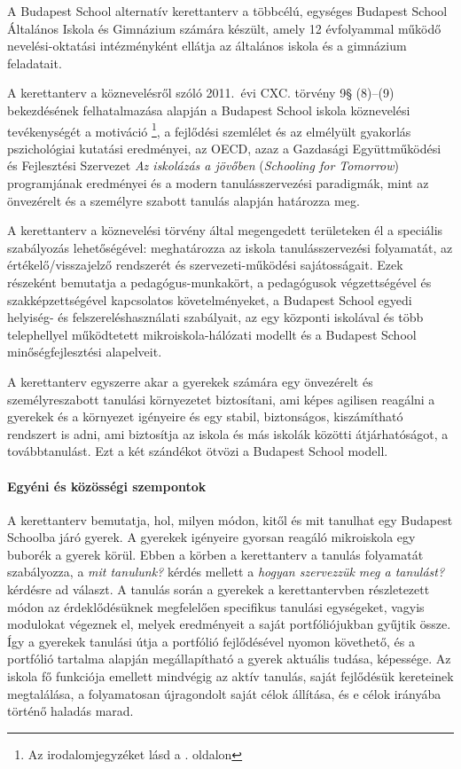 A Budapest School alternatív kerettanterv a többcélú, egységes	Budapest School Általános Iskola és Gimnázium számára készült, amely 12 évfolyammal működő nevelési-oktatási intézményként ellátja az általános iskola és a gimnázium feladatait.

A kerettanterv a köznevelésről szóló 2011.~évi CXC. törvény 9§ (8)--(9) bekezdésének felhatalmazása alapján a Budapest School iskola köznevelési tevékenységét a motiváció \citep{pink2011drive}\footnote{Az irodalomjegyzéket lásd a \pageref{sec:bibliographyk}. oldalon}, a fejlődési szemlélet \citep{growthmindset} és az elmélyült gyakorlás \citep{ericsson2016peak} pszichológiai kutatási eredményei, az  OECD, azaz a Gazdasági Együttműködési és Fejlesztési Szervezet \emph{Az iskolázás a jövőben}  (\emph{Schooling for Tomorrow}) programjának eredményei \citep{2006schooling} és a modern tanulásszervezési paradigmák, mint az önvezérelt \citep{mitra2012beyond} és a személyre szabott \citep{khan2012one} tanulás alapján határozza meg.

A kerettanterv a köznevelési törvény által megengedett területeken él a speciális szabályozás lehetőségével: meghatározza az iskola tanulásszervezési folyamatát, az értékelő/visszajelző rendszerét és szervezeti-működési sajátosságait. Ezek részeként bemutatja a pedagógus-munkakört, a pedagógusok végzettségével és szakképzettségével kapcsolatos követelményeket, a Budapest School	egyedi helyiség- és felszereléshasználati szabályait, az egy központi iskolával és több telephellyel működtetett mikroiskola-hálózati modellt és a Budapest School minőségfejlesztési alapelveit.

A kerettanterv egyszerre akar a gyerekek számára egy önvezérelt és személyreszabott tanulási környezetet biztosítani, ami képes agilisen reagálni a gyerekek és a környezet igényeire és egy stabil, biztonságos, kiszámítható rendszert is adni, ami biztosítja az iskola és más iskolák közötti átjárhatóságot, a továbbtanulást. Ezt a két szándékot ötvözi a Budapest School modell.

\clearpage


\paragraph{Egyéni és közösségi szempontok} A kerettanterv bemutatja,
hol, milyen\linebreak
módon, kitől és mit tanulhat egy Budapest Schoolba járó gyerek.
A gyerekek igényeire gyorsan reagáló mikroiskola egy buborék a gyerek körül. Ebben a körben a kerettanterv a tanulás folyamatát szabályozza, a \emph{mit tanulunk?} kérdés mellett a \emph{hogyan szervezzük meg a tanulást?} kérdésre ad választ. A tanulás során a gyerekek a kerettantervben részletezett módon az érdeklődésüknek megfelelően specifikus tanulási egységeket, vagyis modulokat végeznek el, melyek eredményeit a saját portfóliójukban gyűjtik össze. Így a gyerekek tanulási útja a portfólió fejlődésével nyomon követhető, és a portfólió tartalma alapján megállapítható a gyerek aktuális tudása, képessége. Az iskola fő funkciója emellett mindvégig az aktív tanulás, saját fejlődésük kereteinek megtalálása, a folyamatosan újragondolt saját célok állítása, és e célok irányába történő haladás marad.
 
